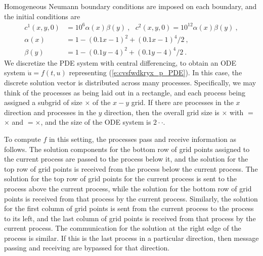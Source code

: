 Homogeneous Neumann boundary conditions are imposed on each boundary, and the
initial conditions are 
\begin{equation} \label{e:cvsfwdkryx_p_IC}
  \begin{split}
  c^{1}(x,y,0) &= 10^{6}\alpha (x)\beta (y) ~,~~~ 
                    c^{2}(x,y,0)=10^{12}\alpha(x)\beta (y) ~, \\
  \alpha (x) &= 1-(0.1x-1)^{2}+(0.1x-1)^{4}/2 ~, \\
  \beta (y) &= 1-(0.1y-4)^{2}+(0.1y-4)^{4}/2 ~.
  \end{split} 
\end{equation}
We discretize the PDE system with central differencing, to
obtain an ODE system ${\dot u} = f(t,u)$ representing (\ref{e:cvsfwdkryx_p_PDE}).  
In this case, the discrete solution vector is distributed across
many processes.  Specifically, we may think of the processes as
being laid out in a rectangle, and each process being assigned a
subgrid of size $\times$ of the $x-y$ grid. If
there are  processes in the $x$ direction and 
processes in the $y$ direction, then the overall grid size is
$\times$ with $=$$\times$ and
$=$$\times$, and the size of the ODE system is
$2\cdot$$\cdot$.  

To compute $f$ in this setting, the processes pass and receive
information as follows.  The solution components for the bottom row of
grid points assigned to the current process are passed to the process below
it, and the solution for the top row of grid points is received from
the process below the current process. The solution for the top
row of grid points for the current process is sent to the process
above the current process, while the solution for the bottom row of
grid points is received from that process by the current
process. Similarly, the solution for the first column of grid points
is sent from the current process to the process to its left, and
the last column of grid points is received from that process by the
current process. The communication for the solution at the right
edge of the process is similar. If this is the last process in a
particular direction, then message passing and receiving are bypassed
for that direction.

